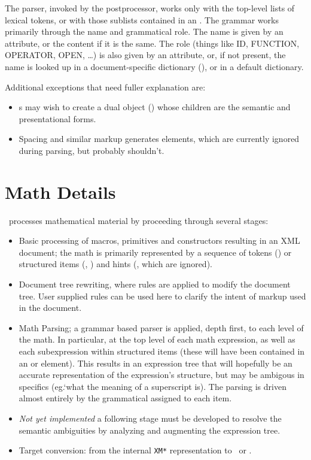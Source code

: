 \documentclass{book}
\begin{document}
The parser, invoked by the postprocessor, works only with the top-level lists of lexical tokens,
or with those sublists contained in an .  The grammar works primarily through
the name and grammatical role.  The name is given by an attribute, or the content if it is
the same.  The role (things like ID, FUNCTION, OPERATOR, OPEN, \ldots) is also given
by an attribute, or, if not present, the name is looked up in a document-specific
dictionary (), or in a default dictionary.

Additional exceptions that need fuller explanation are: 
\begin{itemize}
 \item {}s may wish to create a dual object () whose children are 
the semantic and presentational forms.
 \item Spacing and similar markup generates  elements, which are currently ignored
during parsing, but probably shouldn't.
\end{itemize}

\section{Math Details}\label{math.details}
\LaTeXML\ processes mathematical material by proceeding through several stages:
\begin{itemize}
\item Basic processing of macros, primitives and constructors resulting in
   an XML document; the math is primarily represented by a sequence of
   tokens () or structured items (, ) and
   hints (, which are ignored).
\item Document tree rewriting, where rules are applied to modify the document tree.
   User supplied rules can be used here to clarify the intent of markup used in the document.
\item Math Parsing; a grammar based parser is applied, depth first, to each level of the math.
   In particular, at the top level of each math expression, as well as each
   subexpression within structured items (these will have been contained in
   an  or  element).  This results in an expression tree
   that will hopefully be an accurate representation of the expression's structure,
   but may be ambigous in specifics (eg.`what the meaning of a superscript is).
   The parsing is driven almost entirely by the grammatical  assigned
   to each item.
\item \emph{Not yet implemented} a following stage must be developed to resolve
   the semantic ambiguities by analyzing and augmenting the expression tree.
\item Target conversion: from the internal \texttt{XM*} representation to
   \MathML\ or \OpenMath.
\end{itemize}
\end{document}
